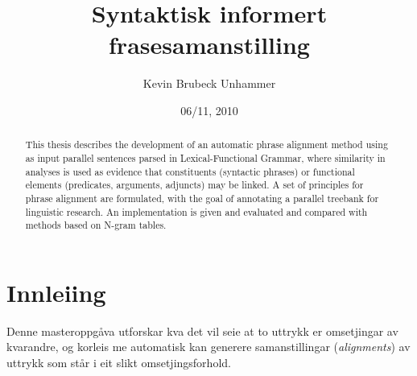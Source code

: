 \documentclass[11pt,a4paper,oneside,draft]{report}
\title{Syntaktisk informert frasesamanstilling }
\author{Kevin Brubeck Unhammer}
\date{06/11, 2010}
\begin{document}
\maketitle

\setcounter{tocdepth}{4}
\tableofcontents
\vspace*{1cm}

 
\begin{abstract}
\noindent


This thesis describes the development of an automatic phrase alignment
 method using as input parallel sentences parsed in Lexical-Functional
 Grammar, where similarity in analyses is used as evidence that
 constituents (syntactic phrases) or functional elements (predicates,
 arguments, adjuncts) may be linked. A set of principles for phrase
 alignment are formulated, with the goal of annotating a parallel
 treebank for linguistic research.  An implementation is given and
 evaluated and compared with methods based on N-gram tables.

\end{abstract}



\chapter{Innleiing}
\label{sec-1}

\label{SEC:innleiing}



Denne masteroppgåva utforskar kva det vil seie at to uttrykk er
omsetjingar av kvarandre, og korleis me automatisk kan generere
samanstillingar (\emph{alignments}) av uttrykk som står i eit slikt
omsetjingsforhold.
\end{document}

